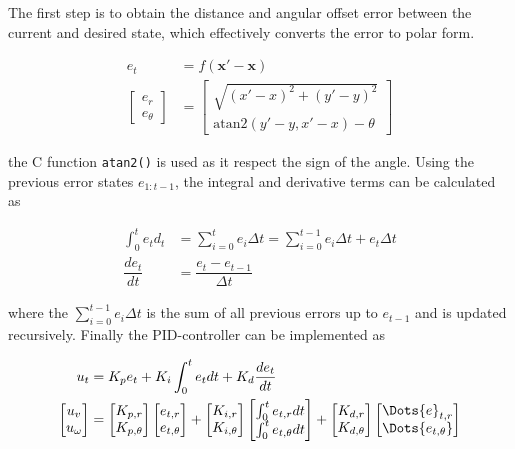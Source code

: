 The first step is to obtain the distance and angular offset error between the current and desired state, which effectively converts the error to polar form.

\begin{align}
    e_t &= f(\mathbf{x}' - \mathbf{x}) \\
    \begin{bmatrix} e_r \\ e_\theta \end{bmatrix} &= \begin{bmatrix}
        \sqrt{(x' - x)^2 + (y' - y)^2} \\
        \text{atan2}(y' - y, x' - x) - \theta
    \end{bmatrix}
\end{align}

the C function \texttt{atan2()} is used as it respect the sign of the angle. Using the previous error states $e_{1:t-1}$, the integral and derivative terms can be calculated as

\begin{align}
    \int_0^t e_t d_t &= \sum_{i=0}^t e_i \Delta t = \sum_{i=0}^{t-1} e_i \Delta t + e_t \Delta t \\
    \dfrac{de_t}{dt} &= \dfrac{e_t - e_{t-1}}{\Delta t}
\end{align}

where the $\sum_{i=0}^{t-1} e_i \Delta t$ is the sum of all previous errors up to $e_{t-1}$ and is updated recursively. Finally the PID-controller can be implemented as

\begin{align}
    u_t &= K_p e_t + K_i \int_0^t e_t dt + K_d \dfrac{de_t}{dt} \\
    \begin{bmatrix} u_v \\ u_\omega \end{bmatrix} &= 
    \begin{bmatrix} K_{p,r} \\ K_{p,\theta} \end{bmatrix}
    \begin{bmatrix} e_{t,r} \\ e_{t,\theta} \end{bmatrix} +
    \begin{bmatrix} K_{i,r} \\ K_{i,\theta} \end{bmatrix}
    \begin{bmatrix} \int_0^t e_{t,r} dt \\ \int_0^t e_{t,\theta} dt \end{bmatrix} +
    \begin{bmatrix} K_{d,r} \\ K_{d,\theta} \end{bmatrix}
    \begin{bmatrix} \Dots{e}_{t,r} \\ \Dots{e_{t,\theta}} \end{bmatrix} 
\end{align}

